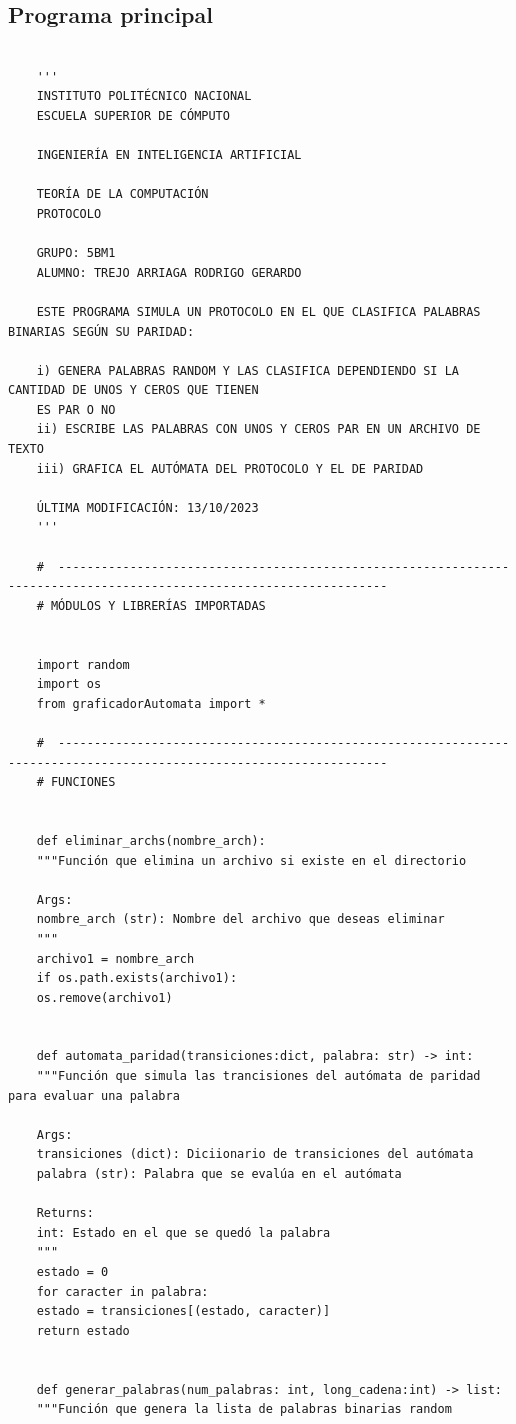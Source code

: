 \documentclass[11pt]{article} %
\begin{document}
	\subsection{Programa principal}
	
	\begin{lstlisting}
		
	'''
	INSTITUTO POLITÉCNICO NACIONAL
	ESCUELA SUPERIOR DE CÓMPUTO
	
	INGENIERÍA EN INTELIGENCIA ARTIFICIAL
	
	TEORÍA DE LA COMPUTACIÓN
	PROTOCOLO
	
	GRUPO: 5BM1
	ALUMNO: TREJO ARRIAGA RODRIGO GERARDO
	
	ESTE PROGRAMA SIMULA UN PROTOCOLO EN EL QUE CLASIFICA PALABRAS BINARIAS SEGÚN SU PARIDAD:
	
	i) GENERA PALABRAS RANDOM Y LAS CLASIFICA DEPENDIENDO SI LA CANTIDAD DE UNOS Y CEROS QUE TIENEN
	ES PAR O NO
	ii) ESCRIBE LAS PALABRAS CON UNOS Y CEROS PAR EN UN ARCHIVO DE TEXTO
	iii) GRAFICA EL AUTÓMATA DEL PROTOCOLO Y EL DE PARIDAD
	
	ÚLTIMA MODIFICACIÓN: 13/10/2023
	'''
	
	#  --------------------------------------------------------------------------------------------------------------------
	# MÓDULOS Y LIBRERÍAS IMPORTADAS
	
	
	import random
	import os
	from graficadorAutomata import *
	
	#  --------------------------------------------------------------------------------------------------------------------
	# FUNCIONES
	
	
	def eliminar_archs(nombre_arch):
	"""Función que elimina un archivo si existe en el directorio
	
	Args:
	nombre_arch (str): Nombre del archivo que deseas eliminar
	"""
	archivo1 = nombre_arch
	if os.path.exists(archivo1):
	os.remove(archivo1)
	
	
	def automata_paridad(transiciones:dict, palabra: str) -> int:
	"""Función que simula las trancisiones del autómata de paridad para evaluar una palabra
	
	Args:
	transiciones (dict): Diciionario de transiciones del autómata
	palabra (str): Palabra que se evalúa en el autómata
	
	Returns:
	int: Estado en el que se quedó la palabra
	"""
	estado = 0
	for caracter in palabra:
	estado = transiciones[(estado, caracter)]
	return estado
	
	
	def generar_palabras(num_palabras: int, long_cadena:int) -> list:
	"""Función que genera la lista de palabras binarias random
	

\end{lstlisting}
\end{document}
